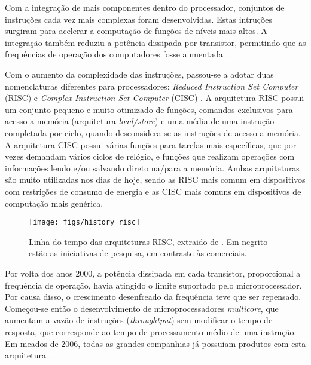 \documentclass[11pt,a4paper,oneside]{book}
\begin{document}
Com a integra\c{c}\~ao de mais componentes dentro do processador, conjuntos de instru\c{c}\~oes cada vez mais complexas foram desenvolvidas.
Estas intru\c{c}\~oes surgiram para acelerar a computa\c{c}\~ao de fun\c{c}\~oes de n\'iveis mais altos.
A integra\c{c}\~ao tamb\'em reduziu a pot\^encia dissipada por transistor, permitindo que as frequ\^encias de opera\c{c}\~ao dos computadores fosse aumentada \cite{Hennessy2011}.

Com o aumento da complexidade das instruções, passou-se a adotar duas nomenclaturas diferentes para processadores: \textit{Reduced Instruction Set Computer} (RISC) e \textit{Complex Instruction Set Computer} (CISC) \cite{Fedeli2003}.
A arquitetura RISC possui um conjunto pequeno e muito otimizado de funções, comandos exclusivos para acesso a memória (arquitetura \textit{load/store}) e uma média de uma instrução completada por ciclo, quando desconsidera-se as instruções de acesso a memória.
A arquitetura CISC possui várias funções para tarefas mais específicas, que por vezes demandam vários ciclos de relógio, e funções que realizam operações com informações lendo e/ou salvando direto na/para a memória.
Ambas arquiteturas são muito utilizadas nos dias de hoje, sendo as RISC mais comum em dispositivos com restrições de consumo de energia e as CISC mais comuns em dispositivos de computação mais genérica.


\begin{figure}[h]
\centering
\texttt{[image: figs/history\_risc]}
\caption{Linha do tempo das arquiteturas RISC, extraido de \cite{Hennessy2011}. Em negrito estão as iniciativas de pesquisa, em contraste às comerciais.}
\label{fig:history_risc}
\end{figure}

Por volta dos anos 2000, a pot\^encia dissipada em cada transistor, proporcional a frequência de opera\c{c}\~ao, havia atingido o limite suportado pelo microprocessador.
Por causa disso, o crescimento desenfreado da frequ\^encia teve que ser repensado.
Come\c{c}ou-se ent\~ao o desenvolvimento de microprocessadores \textit{multicore}, que aumentam a vaz\~ao de instru\c{c}\~oes (\textit{throughtput}) sem modificar o tempo de resposta, que corresponde ao tempo de processamento médio de uma instrução.
Em meados de 2006, todas as grandes companhias j\'a possuiam produtos com esta arquitetura \cite{Hennessy2011}.
\end{document}
